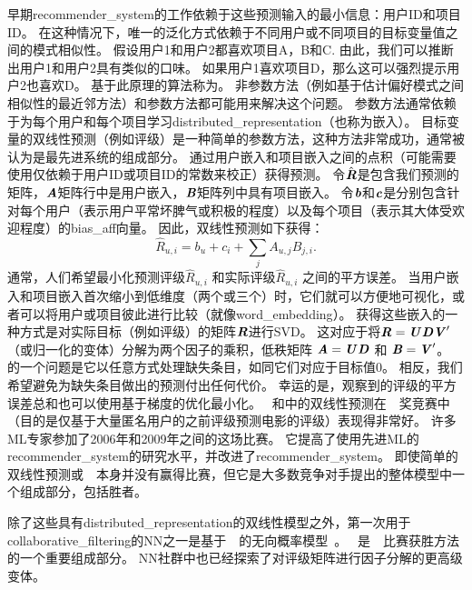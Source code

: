 早期\gls{recommender_system}的工作依赖于这些预测输入的最小信息：用户ID和项目ID。
在这种情况下，唯一的泛化方式依赖于不同用户或不同项目的目标变量值之间的模式相似性。
假设用户1和用户2都喜欢项目A，B和C.
由此，我们可以推断出用户1和用户2具有类似的口味。
如果用户1喜欢项目D，那么这可以强烈提示用户2也喜欢D。
基于此原理的算法称为。
非参数方法（例如基于估计偏好模式之间相似性的最近邻方法）和参数方法都可能用来解决这个问题。
参数方法通常依赖于为每个用户和每个项目学习\gls{distributed_representation}（也称为嵌入）。
目标变量的双线性预测（例如评级）是一种简单的参数方法，这种方法非常成功，通常被认为是最先进系统的组成部分。
通过用户嵌入和项目嵌入之间的点积（可能需要使用仅依赖于用户ID或项目ID的常数来校正）获得预测。
令$\hat{\boldsymbol{\mathit{R}}}$是包含我们预测的矩阵，$\boldsymbol{\mathit{A}}$矩阵行中是用户嵌入，$\boldsymbol{\mathit{B}}$矩阵列中具有项目嵌入。
令$\boldsymbol{\mathit{b}}$和$\boldsymbol{\mathit{c}}$是分别包含针对每个用户（表示用户平常坏脾气或积极的程度）以及每个项目（表示其大体受欢迎程度）的\gls{bias_aff}向量。
因此，双线性预测如下获得：
\begin{equation}
\label{eq:bilinear-prediction}
 \hat{R}_{u,i} = b_u + c_i + \sum_j A_{u,j} B_{j,i}.
\end{equation}
通常，人们希望最小化预测评级$\hat{R}_{u,i}$ 和实际评级$\hat{R}_{u,i}$ 之间的平方误差。
当用户嵌入和项目嵌入首次缩小到低维度（两个或三个）时，它们就可以方便地可视化，或者可以将用户或项目彼此进行比较（就像\gls{word_embedding}）。
获得这些嵌入的一种方式是对实际目标（例如评级）的矩阵$\boldsymbol{\mathit{R}}$进行\gls{SVD}。
这对应于将$\boldsymbol{\mathit{R}} = \boldsymbol{\mathit{U}} \boldsymbol{\mathit{D}} \boldsymbol{\mathit{V}}'$（或归一化的变体）分解为两个因子的乘积，低秩矩阵 $\boldsymbol{\mathit{A}}=\boldsymbol{\mathit{U}} \boldsymbol{\mathit{D}}$ 和 $\boldsymbol{\mathit{B}} = \boldsymbol{\mathit{V}}'$。
的一个问题是它以任意方式处理缺失条目，如同它们对应于目标值0。
相反，我们希望避免为缺失条目做出的预测付出任何代价。
幸运的是，观察到的评级的平方误差总和也可以使用基于梯度的优化最小化。
~和中的双线性预测在~~奖竞赛中（目的是仅基于大量匿名用户的之前评级预测电影的评级）表现得非常好\citep{bennett2007netflix}。
许多\gls{ML}专家参加了2006年和2009年之间的这场比赛。
它提高了使用先进\gls{ML}的\gls{recommender_system}的研究水平，并改进了\gls{recommender_system}。
即使简单的双线性预测或~~本身并没有赢得比赛，但它是大多数竞争对手提出的整体模型中一个组成部分，包括胜者\citep{BigChaos-Netflix2009,Koren09}。


除了这些具有\gls{distributed_representation}的双线性模型之外，第一次用于\gls{collaborative_filtering}的\gls{NN}之一是基于~~的无向概率模型~\citep{Salakhutdinov-2007-short}。
~是~~比赛获胜方法的一个重要组成部分\citep{BigChaos-Netflix2009,Koren09}。
\gls{NN}社群中也已经探索了对评级矩阵进行因子分解的更高级变体\citep{Salakhutdinov2008-small}。

